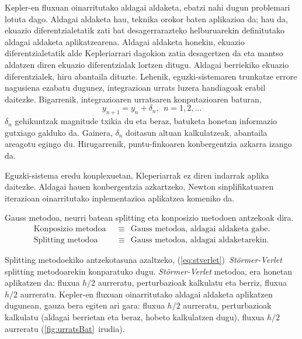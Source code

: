 Kepler-en fluxuan oinarritutako aldagai aldaketa, ebatzi nahi dugun problemari lotuta dago. Aldagai aldaketa hau, teknika orokor baten aplikazioa da; hau da, ekuazio diferentzialetatik zati bat desagerrarazteko helburuarekin definitutako aldagai aldaketa aplikatzearena. Aldagai aldaketa honekin, ekuazio diferentzialetatik alde Kepleriarrari dagokion zatia desagertzen da eta mantso aldatzen diren ekuazio diferentzialak lortzen ditugu.  Aldagai berriekiko ekuazio diferentzialek, hiru abantaila dituzte. Lehenik, eguzki-sistemaren trunkatze errore nagusiena ezabatu dugunez, integrazioan urrats luzera handiagoak erabil daitezke. Bigarrenik, integrazioaren urratsaren konputazioaren baturan,
\begin{equation*}
 y_{n+1}=y_{n}+\delta_n, \ \ n=1,2,\dots
\end{equation*}
$\delta_n$ gehikuntzak magnitude txikia du eta beraz, batuketa honetan informazio gutxiago galduko da. Gainera, $\delta_n$ doitasun altuan kalkulatzeak, abantaila areagotu egingo du. Hirugarrenik, puntu-finkoaren konbergentzia azkarra izango da.

Eguzki-sistema eredu konplexuetan, Kleperiarrak ez diren indarrak aplika daitezke. Aldagai hauen konbergentzia azkartzeko, Newton sinplifikatuaren iterazioan oinarritutako inplementazioa aplikatzea komeniko da.                  

Gauss metodoa, neurri batean  splitting eta konposizio metodoen antzekoak dira. 
\begin{align*}
\text{Konposizio metodoa} \ \ &\equiv \ \ \text{Gauss metodoa, aldagai aldaketa gabe}.\\
\text{Splitting metodoa}  \ \ &\equiv \ \  \text{Gauss metodoa, aldagai aldaketarekin}.
\end{align*}

Splitting metodoekiko antzekotasuna azaltzeko, (\ref{eq:stverlet})~\emph{Störmer-Verlet} splitting metodoarekin konparatuko dugu. \emph{Störmer-Verlet} metodoa, era honetan aplikatzen da:  fluxua $h/2$ aurreratu, perturbazioak kalkulatu eta berriz,  fluxua $h/2$ aurreratu. Kepler-en fluxuan oinarritutako aldagai aldaketa aplikatzen dugunean, gauza bera egiten ari gara:  fluxua $h/2$ aurreratu, perturbazioak kalkulatu (aldagai berrietan eta beraz, hobeto kalkulatzen dugu),  fluxua $h/2$ aurreratu (\ref{fig:urratsBat}~irudia).


